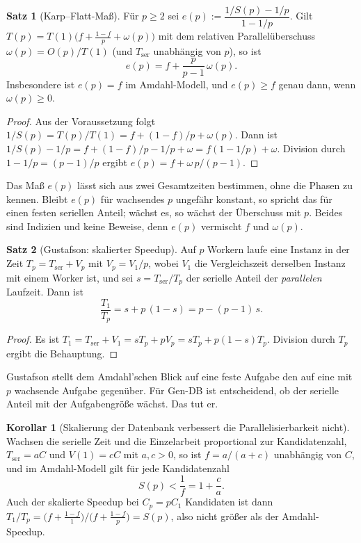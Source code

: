 \documentclass[a4paper,12pt, twoside]{report}
\theoremstyle{definition}
\newtheorem{satz}{Satz}
\newtheorem{korollar}{Korollar}
\begin{document}
\begin{satz}[Karp--Flatt-Maß]
\label{satz:p910_karpflatt}
Für $p\ge 2$ sei $e(p):=\dfrac{1/S(p)-1/p}{1-1/p}$. Gilt $T(p)=T(1)\bigl(f+\tfrac{1-f}{p}+\omega(p)\bigr)$ mit dem relativen Parallelüberschuss $\omega(p)=O(p)/T(1)$ (und $T_{\mathrm{ser}}$ unabhängig von $p$), so ist
\[
e(p)=f+\frac{p}{p-1}\,\omega(p).
\]
Insbesondere ist $e(p)=f$ im Amdahl-Modell, und $e(p)\ge f$ genau dann, wenn $\omega(p)\ge 0$.
\end{satz}

\begin{proof}
Aus der Voraussetzung folgt $1/S(p)=T(p)/T(1)=f+(1-f)/p+\omega(p)$. Dann ist $1/S(p)-1/p=f+(1-f)/p-1/p+\omega=f(1-1/p)+\omega$. Division durch $1-1/p=(p-1)/p$ ergibt $e(p)=f+\omega\,p/(p-1)$.
\end{proof}

Das Maß $e(p)$ lässt sich aus zwei Gesamtzeiten bestimmen, ohne die Phasen zu kennen. Bleibt $e(p)$ für wachsendes $p$ ungefähr konstant, so spricht das für einen festen seriellen Anteil; wächst es, so wächst der Überschuss mit $p$. Beides sind Indizien und keine Beweise, denn $e(p)$ vermischt $f$ und $\omega(p)$.

\begin{satz}[Gustafson: skalierter Speedup]
\label{satz:p910_gustafson}
Auf $p$ Workern laufe eine Instanz in der Zeit $T_p=T_{\mathrm{ser}}+V_p$ mit $V_p=V_1/p$, wobei $V_1$ die Vergleichszeit derselben Instanz mit einem Worker ist, und sei $s=T_{\mathrm{ser}}/T_p$ der serielle Anteil der \emph{parallelen} Laufzeit. Dann ist
\[
\frac{T_1}{T_p}=s+p\,(1-s)=p-(p-1)\,s.
\]
\end{satz}

\begin{proof}
Es ist $T_1=T_{\mathrm{ser}}+V_1=sT_p+pV_p=sT_p+p(1-s)T_p$. Division durch $T_p$ ergibt die Behauptung.
\end{proof}

Gustafson stellt dem Amdahl'schen Blick auf eine feste Aufgabe den auf eine mit $p$ wachsende Aufgabe gegenüber. Für Gen-DB ist entscheidend, ob der serielle Anteil mit der Aufgabengröße wächst. Das tut er.

\begin{korollar}[Skalierung der Datenbank verbessert die Parallelisierbarkeit nicht]
\label{kor:p910_skalierung}
Wachsen die serielle Zeit und die Einzelarbeit proportional zur Kandidatenzahl, $T_{\mathrm{ser}}=aC$ und $V(1)=cC$ mit $a,c>0$, so ist $f=a/(a+c)$ unabhängig von $C$, und im Amdahl-Modell gilt für jede Kandidatenzahl
\[
S(p)<\frac1f=1+\frac ca .
\]
Auch der skalierte Speedup bei $C_p=pC_1$ Kandidaten ist dann $T_1/T_p=\bigl(f+\tfrac{1-f}{1}\bigr)\big/\bigl(f+\tfrac{1-f}{p}\bigr)=S(p)$, also nicht größer als der Amdahl-Speedup.
\end{korollar}
\end{document}
